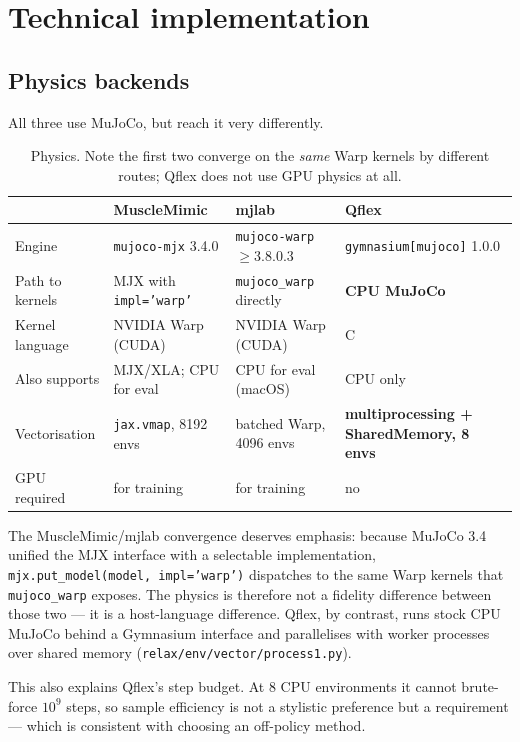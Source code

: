\documentclass[11pt,a4paper]{article}
\newcommand{\no}{no}
\begin{document}
\section{Technical implementation}

\subsection{Physics backends}

All three use MuJoCo, but reach it very differently.

\begin{table}[h!]
\centering
\footnotesize
\begin{tabular}{@{}lL{3.1cm}L{3.1cm}L{3.5cm}@{}}
\toprule
 & \textcolor{mmC}{MuscleMimic} & \textcolor{mjC}{mjlab} & \textcolor{qfC}{Qflex} \\
\midrule
Engine & \texttt{mujoco-mjx} 3.4.0 & \texttt{mujoco-warp} $\ge$3.8.0.3 & \texttt{gymnasium[mujoco]} 1.0.0 \\
Path to kernels & MJX with \texttt{impl='warp'} & \texttt{mujoco\_warp} directly & \textbf{CPU MuJoCo} \\
Kernel language & NVIDIA Warp (CUDA) & NVIDIA Warp (CUDA) & C \\
Also supports & MJX/XLA; CPU for eval & CPU for eval (macOS) & CPU only \\
Vectorisation & \texttt{jax.vmap}, 8192 envs & batched Warp, 4096 envs & \textbf{multiprocessing + SharedMemory, 8 envs} \\
GPU required & for training & for training & \no \\
\bottomrule
\end{tabular}
\caption{Physics. Note the first two converge on the \emph{same} Warp kernels by different
routes; Qflex does not use GPU physics at all.}
\end{table}

\noindent
The MuscleMimic/mjlab convergence deserves emphasis: because MuJoCo 3.4 unified the MJX
interface with a selectable implementation, \texttt{mjx.put\_model(model, impl='warp')}
dispatches to the same Warp kernels that \texttt{mujoco\_warp} exposes. The physics is
therefore not a fidelity difference between those two --- it is a host-language
difference. Qflex, by contrast, runs stock CPU MuJoCo behind a Gymnasium interface and
parallelises with worker processes over shared memory
(\texttt{relax/env/vector/process1.py}).

This also explains Qflex's step budget. At 8 CPU environments it cannot brute-force
$10^9$ steps, so sample efficiency is not a stylistic preference but a requirement ---
which is consistent with choosing an off-policy method.
\end{document}
